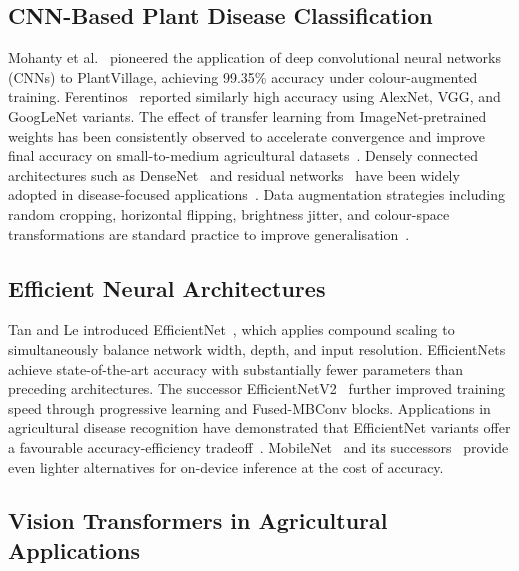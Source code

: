 \documentclass[conference]{IEEEtran}
\begin{document}
\subsection{CNN-Based Plant Disease Classification}

Mohanty et al.~\cite{mohanty2016deep} pioneered the application of deep
convolutional neural networks (CNNs) to PlantVillage, achieving 99.35\% accuracy
under colour-augmented training. Ferentinos~\cite{ferentinos2018deep} reported
similarly high accuracy using AlexNet, VGG, and GoogLeNet variants. The effect
of transfer learning from ImageNet-pretrained weights has been consistently
observed to accelerate convergence and improve final accuracy on small-to-medium
agricultural datasets~\cite{too2019comparative,kamilaris2018deep,tm2018detection}.
Densely connected architectures such as DenseNet~\cite{huang2017densely} and
residual networks~\cite{he2016deep} have been widely adopted in disease-focused
applications~\cite{agarwal2020neural,Chen2020identify}. Data augmentation
strategies including random cropping, horizontal flipping, brightness jitter, and
colour-space transformations are standard practice to improve
generalisation~\cite{shorten2019survey,cubuk2020randaugment}.

\subsection{Efficient Neural Architectures}

Tan and Le introduced EfficientNet~\cite{tan2019efficientnet}, which applies
compound scaling to simultaneously balance network width, depth, and input
resolution. EfficientNets achieve state-of-the-art accuracy with substantially
fewer parameters than preceding architectures. The successor
EfficientNetV2~\cite{tan2021efficientnetv2} further improved training speed
through progressive learning and Fused-MBConv blocks. Applications in
agricultural disease recognition have demonstrated that EfficientNet variants
offer a favourable accuracy-efficiency tradeoff~\cite{ahmed2022automated,
howlader2022effects,mahum2023novel}. MobileNet~\cite{howard2017mobilenets}
and its successors~\cite{sandler2018mobilenetv2,howard2019searching} provide
even lighter alternatives for on-device inference at the cost of accuracy.

\subsection{Vision Transformers in Agricultural Applications}
\end{document}
